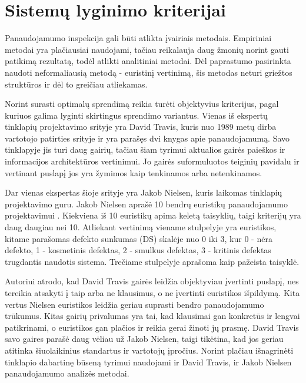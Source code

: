 \documentclass{VUMIFPSbakalaurinis}
\begin{document}

\section{Sistemų lyginimo kriterijai}
Panaudojamumo inspekcija gali būti atlikta įvairiais metodais. Empiriniai metodai yra plačiausiai naudojami\cite{NielsenUsabilityEn}, tačiau reikalauja daug žmonių norint gauti patikimą rezultatą, todėl atlikti analitiniai metodai. Dėl paprastumo pasirinkta naudoti neformaliausią metodą - euristinį vertinimą, šis metodas neturi griežtos struktūros ir dėl to greičiau atliekamas.

Norint surasti optimalų sprendimą reikia turėti objektyvius kriterijus, pagal kuriuos galima lyginti skirtingus sprendimo variantus. Vienas iš ekspertų tinklapių projektavimo srityje yra David Travis, kuris nuo 1989 metų dirba vartotojo patirties srityje ir yra parašęs dvi knygas apie panaudojamumą. Savo tinklapyje jis turi daug gairių, tačiau šiam tyrimui aktualios gairės paieškos ir informacijos architektūros vertinimui. Jo gairės suformuluotos teiginių pavidalu ir vertinant puslapį jos yra žymimos kaip tenkinamos arba netenkinamos\cite{SearchGuidelinesEn}\cite{NavigationAndIAGuidelinesEn}. 

Dar vienas ekspertas šioje srityje yra Jakob Nielsen, kuris laikomas tinklapių projektavimo guru. Jakob Nielsen aprašė 10 bendrų euristikų panaudojamumo projektavimui \cite{NielsenHeuristicsEn}. Kiekviena iš 10 euristikų apima keletą taisyklių, taigi kriterijų yra daug daugiau nei 10. Atliekant vertinimą viename stulpelyje yra euristikos, kitame parašomas defekto sunkumas (DS) skalėje nuo 0 iki 3, kur 0 - nėra defekto, 1 - kosmetinis defektas, 2 - smulkus defektas, 3 - kritinis defektas trugdantis naudotis sistema. Trečiame stulpelyje aprašoma kaip pažeista taisyklė.

Autoriui atrodo, kad David Travis gairės leidžia objektyviau įvertinti puslapį, nes tereikia atsakyti į taip arba ne klausimus, o ne įvertinti euristikos išpildymą. Kita vertus Nielsen euristikos leidžia geriau suprasti bendro panaudojamumo trūkumus. Kitas gairių privalumas yra tai, kad klausimai gan konkretūs ir lengvai patikrinami, o euristikos gan plačios ir reikia gerai žinoti jų prasmę. David Travis savo gaires parašė daug vėliau už Jakob Nielsen, taigi tikėtina, kad jos geriau atitinka šiuolaikinius standartus ir vartotojų įpročius. Norint plačiau išnagrinėti tinklapio dabartinę būseną tyrimui naudojami ir David Travis, ir Jakob Nielsen panaudojamumo analizės metodai.
\end{document}
